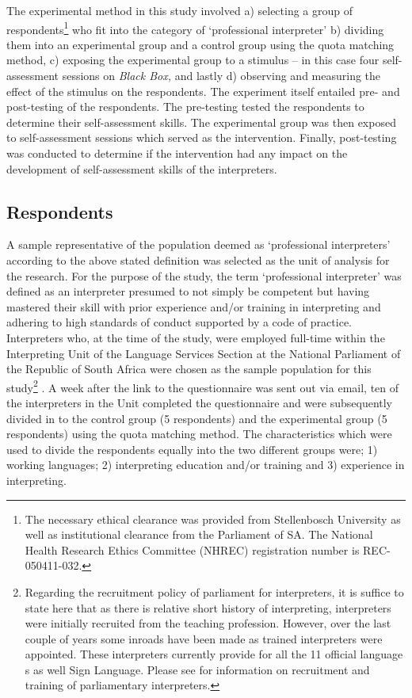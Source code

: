 \documentclass[output=paper]{langsci/langscibook}
\begin{document}
The experimental method in this study involved a) selecting a group of respondents\footnote{The necessary ethical clearance was provided from Stellenbosch University as well as institutional clearance from the Parliament of SA. The National Health Research Ethics Committee (NHREC) registration number is REC-050411-032.} who fit into the category of ‘professional interpreter’ b) dividing them into an experimental group and a control group using the quota matching method, c) exposing the experimental group to a stimulus – in this case four self-assessment sessions on \textit{Black Box,} and lastly d) observing and measuring the effect of the stimulus on the respondents. The experiment itself entailed pre- and post-testing of the respondents. The pre-testing tested the respondents to determine their self-assessment skills. The experimental group was then exposed to self-assessment sessions which served as the intervention. Finally, post-testing was conducted to determine if the intervention had any impact on the development of self-assessment skills of the interpreters. 

\subsection{Respondents}
A sample representative of the population deemed as ‘professional interpreters’ according to the above stated definition was selected as the unit of analysis for the research. For the purpose of the study, the term ‘professional interpreter’ was defined as an interpreter presumed to not simply be competent but having mastered their skill with prior experience and/or training in interpreting and adhering to high standards of conduct supported by a code of practice. Interpreters who, at the time of the study, were employed full-time within the Interpreting Unit of the Language Services Section at the National Parliament of the Republic of South Africa were chosen as the sample population for this study\footnote{Regarding the recruitment policy of parliament for interpreters, it is suffice to state here that as there is relative short history of interpreting, interpreters were initially recruited from the teaching profession. However, over the last couple of years some inroads have been made as trained interpreters were appointed. These interpreters currently provide for all the 11 official language s as well Sign Language.  Please see \citet{Lesch2010} for information on recruitment and training of parliamentary interpreters.} . A week after the link to the questionnaire was sent out via email, ten of the interpreters in the Unit completed the questionnaire and were subsequently divided in to the control group (5 respondents) and the experimental group (5 respondents) using the quota matching method.  The characteristics which were used to divide the respondents equally into the two different groups were; 1) working languages; 2) interpreting education and/or training and 3) experience in interpreting.
\end{document}
